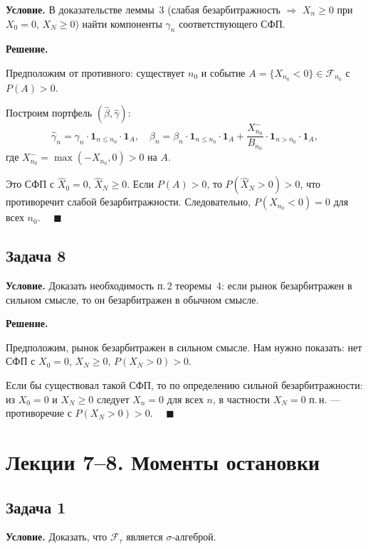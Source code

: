 \documentclass[12pt,a4paper]{article}
\theoremstyle{zadacha}
\begin{document}
\textbf{Условие.} В доказательстве леммы~3 (слабая безарбитражность $\Rightarrow$ $X_n \geq 0$ при $X_0 = 0$, $X_N \geq 0$) найти компоненты $\gamma_n$ соответствующего СФП.

\medskip
\textbf{Решение.}

Предположим от противного: существует $n_0$ и событие $A = \{X_{n_0} < 0\} \in \mathcal{F}_{n_0}$ с $P(A) > 0$.

Построим портфель $(\hat\beta, \hat\gamma)$:
\[
\hat\gamma_n = \gamma_n \cdot \mathbf{1}_{n \leq n_0} \cdot \mathbf{1}_A, \quad
\hat\beta_n = \beta_n \cdot \mathbf{1}_{n \leq n_0} \cdot \mathbf{1}_A + \frac{X_{n_0}^-}{B_{n_0}} \cdot \mathbf{1}_{n > n_0} \cdot \mathbf{1}_A,
\]
где $X_{n_0}^- = \max(-X_{n_0}, 0) > 0$ на $A$.

Это СФП с $\hat X_0 = 0$, $\hat X_N \geq 0$. Если $P(A) > 0$, то $P(\hat X_N > 0) > 0$, что противоречит слабой безарбитражности. Следовательно, $P(X_{n_0} < 0) = 0$ для всех $n_0$. $\quad\blacksquare$

\subsection*{Задача 8}

\textbf{Условие.} Доказать необходимость п.\,2 теоремы~4: если рынок безарбитражен в сильном смысле, то он безарбитражен в обычном смысле.

\medskip
\textbf{Решение.}

Предположим, рынок безарбитражен в сильном смысле. Нам нужно показать: нет СФП с $X_0 = 0$, $X_N \geq 0$, $P(X_N > 0) > 0$.

Если бы существовал такой СФП, то по определению сильной безарбитражности: из $X_0 = 0$ и $X_N \geq 0$ следует $X_n = 0$ для всех $n$, в частности $X_N = 0$ п.\,н. --- противоречие с $P(X_N > 0) > 0$. $\quad\blacksquare$

\section{Лекции 7–8. Моменты остановки}

\subsection*{Задача 1}

\textbf{Условие.} Доказать, что $\mathcal{F}_\tau$ является $\sigma$-алгеброй.
\end{document}

